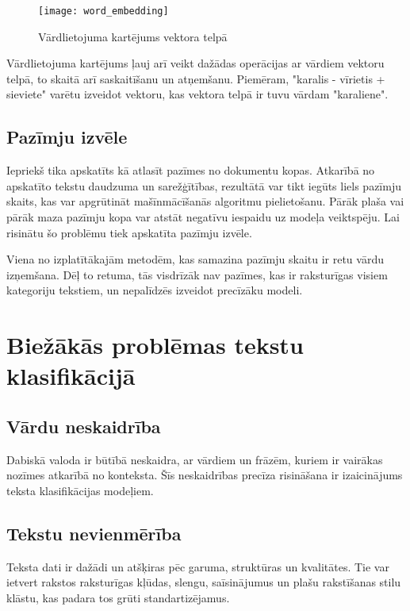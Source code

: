 \begin{figure}[H]
	\texttt{[image: word\_embedding]}
	\caption{Vārdlietojuma kartējums vektora telpā \cite{BaeldungEmbedding} }
	\label{fig:wordembedding}
\end{figure}

Vārdlietojuma kartējums ļauj arī veikt dažādas operācijas ar vārdiem vektoru telpā, to skaitā arī  saskaitīšanu un atņemšanu. Piemēram, "karalis - vīrietis + sieviete" varētu izveidot vektoru, kas vektora telpā ir tuvu vārdam "karaliene".

\subsection{Pazīmju izvēle}
Iepriekš tika apskatīts kā atlasīt pazīmes no dokumentu kopas. Atkarībā no apskatīto tekstu daudzuma un sarežģītības, rezultātā var tikt iegūts liels pazīmju skaits, kas var apgrūtināt mašīnmācīšanās algoritmu pielietošanu. Pārāk plaša vai pārāk maza pazīmju kopa var atstāt negatīvu iespaidu uz modeļa veiktspēju. Lai risinātu šo problēmu tiek apskatīta pazīmju izvēle.

Viena no izplatītākajām metodēm, kas samazina pazīmju skaitu ir retu vārdu izņemšana. Dēļ to retuma, tās visdrīzāk nav pazīmes, kas ir raksturīgas visiem kategoriju tekstiem, un nepalīdzēs izveidot precīzāku modeli.

\section{Biežākās problēmas tekstu klasifikācijā}
\subsection{Vārdu neskaidrība}
 Dabiskā valoda ir būtībā neskaidra, ar vārdiem un frāzēm, kuriem ir vairākas nozīmes atkarībā no konteksta. Šīs neskaidrības precīza risināšana ir izaicinājums teksta klasifikācijas modeļiem.

\subsection{Tekstu nevienmērība}
Teksta dati ir dažādi un atšķiras pēc garuma, struktūras un kvalitātes. Tie var ietvert rakstos raksturīgas kļūdas, slengu, saīsinājumus un plašu rakstīšanas stilu klāstu, kas padara tos grūti standartizējamus.

